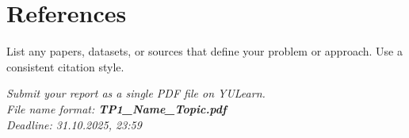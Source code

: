 \documentclass[12pt,a4paper]{article}
\begin{document}
\section{References}
List any papers, datasets, or sources that define your problem or approach. Use a consistent citation style.

\vfill
\begin{center}
    \textit{Submit your report as a single PDF file on YULearn.}\\[4pt]
    \textit{File name format: \textbf{TP1\_Name\_Topic.pdf}}\\[4pt]
    \textit{Deadline: 31.10.2025, 23:59}
\end{center}


\end{document}
